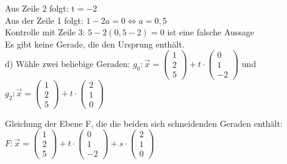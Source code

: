 \documentclass[10pt]{article}
\begin{document}
Aus Zeile 2 folgt: $\mathrm{t}=-2$\\
Aus der Zeile 1 folgt: $1-2 a=0 \Leftrightarrow a=0,5$\\
Kontrolle mit Zeile 3: $5-2(0,5-2)=0$ ist eine falsche Aussage\\
Es gibt keine Gerade, die den Ursprung enthält.\\
d) Wähle zwei beliebige Geraden: $g_{0}: \vec{x}=\left(\begin{array}{l}1 \\ 2 \\ 5\end{array}\right)+t \cdot\left(\begin{array}{c}0 \\ 1 \\ -2\end{array}\right)$ und $g_{2}: \vec{x}=\left(\begin{array}{l}1 \\ 2 \\ 5\end{array}\right)+t \cdot\left(\begin{array}{l}2 \\ 1 \\ 0\end{array}\right)$

Gleichung der Ebene F, die die beiden sich schneidenden Geraden enthält:\\
$F: \vec{x}=\left(\begin{array}{l}1 \\ 2 \\ 5\end{array}\right)+t \cdot\left(\begin{array}{c}0 \\ 1 \\ -2\end{array}\right)+s \cdot\left(\begin{array}{l}2 \\ 1 \\ 0\end{array}\right)$
\end{document}
